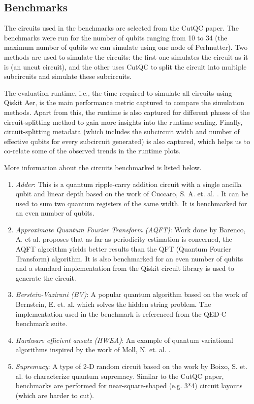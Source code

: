 \subsection{Benchmarks}
\label{sec:benchmarks}

The circuits used in the benchmarks are selected from the CutQC paper. The benchmarks were run for the number of qubits ranging from 10 to 34 (the maximum number of qubits we can simulate using one node of Perlmutter). Two methods are used to simulate the circuits: the first one simulates the circuit as it is (an uncut circuit), and the other uses CutQC to split the circuit into multiple subcircuits and simulate these subcircuits.  

The evaluation runtime, i.e., the time required to simulate all circuits using Qiskit Aer, is the main performance metric captured to compare the simulation methods. Apart from this, the runtime is also captured for different phases of the circuit-splitting method to gain more insights into the runtime scaling. Finally, circuit-splitting metadata (which includes the subcircuit width and number of effective qubits for every subcircuit generated) is also captured, which helps us to co-relate some of the observed trends in the runtime plots.

\vspace{\baselineskip}
\noindent More information about the circuits benchmarked is listed below.

\begin{enumerate}
    \item \textit{Adder}: This is a quantum ripple-carry addition circuit with a single ancilla qubit and linear depth based on the work of Cuccaro, S. A. et. al. \cite{cuccaro2004new}. It can be used to sum two quantum registers of the same width. It is benchmarked for an even number of qubits.
    \item \textit{Approximate Quantum Fourier Transform (AQFT)}: Work done by Barenco, A. et al. \cite{barenco1996approximate} proposes that as far as periodicity estimation is concerned, the AQFT algorithm yields better results than the QFT (Quantum Fourier Transform) algorithm. It is also benchmarked for an even number of qubits and a standard implementation from the Qiskit circuit library is used to generate the circuit.
    \item \textit{Berstein-Vazirani (BV)}: A popular quantum algorithm based on the work of Bernstein, E. et. al. \cite{bernstein1993quantum} which solves the hidden string problem. The implementation used in the benchmark is referenced from the QED-C \cite{qedcBenchmark} benchmark suite.
    \item \textit{Hardware efficient ansatz (HWEA)}: An example of quantum variational algorithms inspired by the work of Moll, N. et. al. \cite{moll2018quantum}.
    \item \textit{Supremacy}: A type of 2-D random circuit based on the work by Boixo, S. et. al. \cite{boixo2018characterizing} to characterize quantum supremacy. Similar to the CutQC paper, benchmarks are performed for near-square-shaped (e.g. 3*4) circuit layouts (which are harder to cut).
\end{enumerate}

